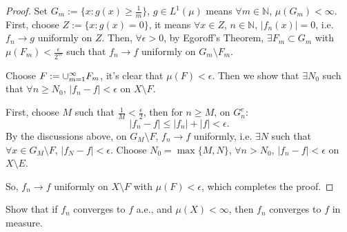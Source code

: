 \begin{proof}
    Set $G_{m}:=\{x:g(x)\ge\frac{1}{m}\}$, 
    $g\in L^{1}(\mu)$ means $\forall m\in\mathbb{N}$, $\mu(G_{m})<\infty$. 
    First, choose $Z:=\{x:g(x)=0\}$, it means 
    $\forall x\in Z$, $n\in\mathbb{N}$, $|f_n(x)|=0$, i.e. $f_{n}\rightarrow g$ uniformly on $Z$.
    Then, $\forall\epsilon>0$, by Egoroff's Theorem, $\exists F_{m}\subset G_{m}$ with $\mu(F_m)<\frac{\epsilon}{2^m}$ such that $f_n\rightarrow f$ 
    uniformly on $G_m\setminus F_m$.
    
    Choose $F:=\cup_{m=1}^{\infty}F_m$, it's clear that 
    $\mu(F)<\epsilon$. Then we show that $\exists N_{0}$ such that $\forall n\ge N_0$, $|f_n-f|<\epsilon$ on $X\setminus F$. 

    First, choose $M$ such that $\frac{1}{M}<\frac{\epsilon}{2}$, then for $n\ge M$, on $G_{n}^{c}$:
    \begin{displaymath}
        |f_n-f|\le|f_n|+|f|<\epsilon.
    \end{displaymath}
    By the discussions above, on $G_{M}\setminus F$, 
    $f_{n}\rightarrow f$ uniformly, i.e. $\exists N$ such that 
    $\forall x\in G_{M}\setminus F$, 
    $|f_{N}-f|<\epsilon$. 
    Choose $N_{0}=\max\{M,N\}$, 
    $\forall n>N_{0}$, $|f_n-f|<\epsilon$ on $X\setminus E$. 

    So, $f_{n}\rightarrow f$ uniformly on $X\setminus F$ with $\mu(F)<\epsilon$, 
    which completes the proof.
\end{proof}
\begin{exc}
    Show that if $f_{n}$ converges to $f$ a.e., and $\mu(X)<\infty$, 
    then $f_{n}$ converges to $f$ in measure.
\end{exc}

